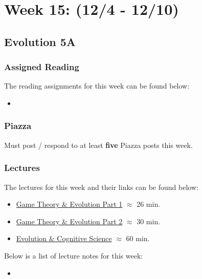 \clearpage
\chapter{Week 15: (12/4 - 12/10)}

\section{Evolution 5A}

\subsection{Assigned Reading}

The reading assignments for this week can be found below:

\begin{itemize}
    \item {}
\end{itemize}

\subsection{Piazza}

Must post / respond to at least \textbf{five} Piazza posts this week.  

\subsection{Lectures}

The lectures for this week and their links can be found below:

\begin{itemize}
    \item \href{https://applied.cs.colorado.edu/mod/hvp/view.php?id=49431}{Game Theory \& Evolution Part 1} $\approx$ 26 min.
    \item \href{https://applied.cs.colorado.edu/mod/hvp/view.php?id=49432}{Game Theory \& Evolution Part 2} $\approx$ 30 min.
    \item \href{https://applied.cs.colorado.edu/mod/hvp/view.php?id=49433}{Evolution \& Cognitive Science} $\approx$ 60 min.
\end{itemize}

\noindent Below is a list of lecture notes for this week:

\begin{itemize}
    \item {}
\end{itemize}

